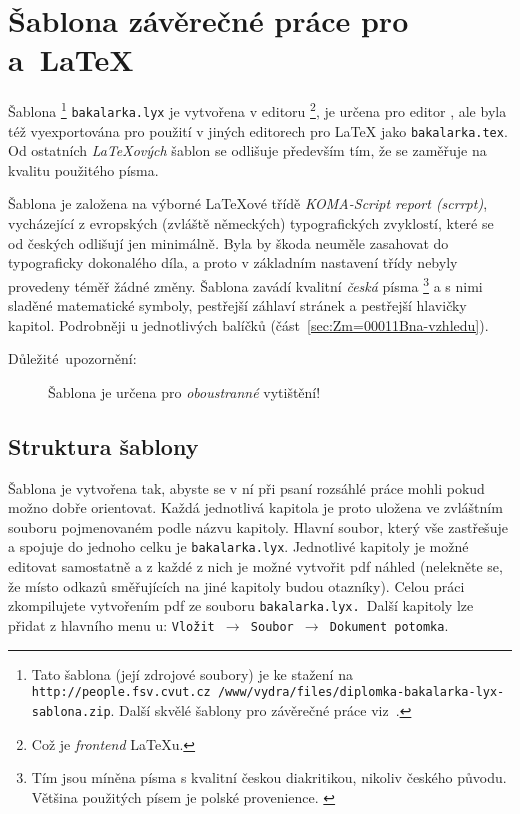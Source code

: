 
\chapter[Šablona pro závěrečné práce ]{Šablona závěrečné práce pro \LyX{} a~\LaTeX{} }

Šablona%
\footnote{Tato šablona (její zdrojové soubory) je ke stažení na \texttt{http://people.fsv.cvut.cz
/www/vydra/files/diplomka-bakalarka-lyx-sablona.zip}. Další skvělé
šablony pro závěrečné práce viz~\cite{Thesis-templates,Diplomka-v-LaTeXu,Jirkovy-stranky,diplPraceSLU,Vavreckova}. %
} \texttt{bakalarka.lyx} je vytvořena v editoru \LyX{}%
\footnote{Což je\emph{ frontend} \LaTeX{}u.%
}, je určena pro editor \LyX{}, ale byla též vyexportována pro použití
v jiných editorech pro \LaTeX{} jako \texttt{bakalarka.tex}. Od ostatních
\emph{\LaTeX{}ových} šablon se odlišuje především tím, že se zaměřuje
na kvalitu použitého písma. 

Šablona je založena na výborné \LaTeX{}ové  třídě \emph{KOMA-Script
report (scrrpt)}, vycházející z evropských (zvláště německých) typografických
zvyklostí, které se od českých odlišují jen minimálně\emph{. }Byla
by škoda neuměle zasahovat do typograficky dokonalého díla, a proto
v základním nastavení třídy nebyly provedeny téměř žádné změny. Šablona
zavádí kvalitní\emph{ česká} písma\emph{}%
\footnote{Tím jsou míněna písma s kvalitní českou diakritikou, nikoliv českého
původu. Většina použitých písem je polské provenience.\emph{ }%
} a s nimi sladěné matematické symboly, pestřejší záhlaví stránek a
pestřejší hlavičky kapitol. Podrobněji u jednotlivých balíčků (část~\ref{sec:Zm=00011Bna-vzhledu}).

\begin{description}
\item [{Důležité~upozornění:}] Šablona je určena pro \emph{oboustranné}
vytištění!%
\marginpar{\textbf{\Huge }%
\ovalbox{\textbf{\Huge !}}%
}
\end{description}

\section{Struktura šablony}

Šablona je vytvořena tak, abyste se v ní při psaní rozsáhlé práce
mohli pokud možno dobře orientovat. Každá jednotlivá kapitola je proto
uložena ve zvláštním souboru pojmenovaném podle názvu kapitoly. Hlavní
soubor, který vše zastřešuje a spojuje do jednoho celku je \texttt{bakalarka.lyx}.
Jednotlivé kapitoly je možné editovat samostatně a z každé z nich
je možné vytvořit pdf náhled (nelekněte se, že místo odkazů směřujících
na jiné kapitoly budou otazníky). Celou práci zkompilujete vytvořením
pdf ze souboru \texttt{bakalarka.lyx. }Další kapitoly lze přidat z
hlavního menu \LyX{}u: \texttt{Vložit $\rightarrow$ Soubor $\rightarrow$
Dokument potomka}.



